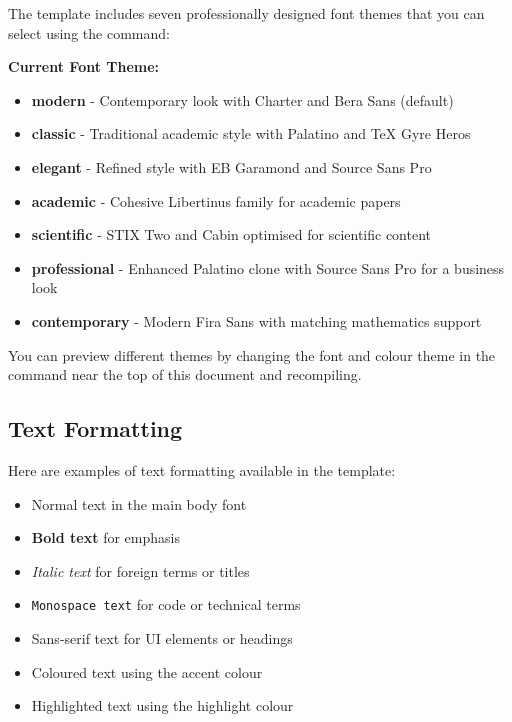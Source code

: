 \documentclass[a4paper,11pt]{article}
\begin{document}
The template includes seven professionally designed font themes that you can select using the \inlinecode{\\usetheme} command:

\begin{center}
\large\textbf{Current Font Theme: \textcolor{accentcolor}{\fonttheme}}
\end{center}

\begin{itemize}
    \item \textbf{modern} - Contemporary look with Charter and Bera Sans (default)
    \item \textbf{classic} - Traditional academic style with Palatino and TeX Gyre Heros
    \item \textbf{elegant} - Refined style with EB Garamond and Source Sans Pro
    \item \textbf{academic} - Cohesive Libertinus family for academic papers
    \item \textbf{scientific} - STIX Two and Cabin optimised for scientific content
    \item \textbf{professional} - Enhanced Palatino clone with Source Sans Pro for a business look
    \item \textbf{contemporary} - Modern Fira Sans with matching mathematics support
\end{itemize}

You can preview different themes by changing the font and colour theme in the  command near the top of this document and recompiling.

\subsection{Text Formatting}

Here are examples of text formatting available in the template:

\begin{itemize}
    \item Normal text in the main body font
    \item \textbf{Bold text} for emphasis
    \item \textit{Italic text} for foreign terms or titles
    \item \texttt{Monospace text} for code or technical terms
    \item \textsf{Sans-serif text} for UI elements or headings
    \item \textcolor{accentcolor}{Coloured text} using the accent colour
    \item \textcolor{highlightcolor}{Highlighted text} using the highlight colour
\end{itemize}
\end{document}
